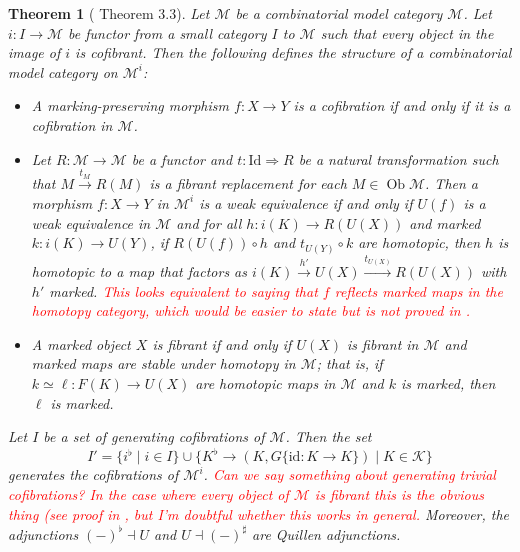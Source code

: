 \documentclass{article}
\newcommand{\todo}[1]{\textcolor{red}{#1}}
\newtheorem{theorem}{Theorem}
\begin{document}
\begin{theorem}[\cite{marked-objects} Theorem 3.3]
  \label{th:marked-model-category}
  Let $\mathcal{M}$ be a combinatorial model category $\mathcal{M}$.
  Let $i : I \rightarrow \mathcal{M}$ be functor from a small category $I$ to $\mathcal{M}$ such that every object in the image of $i$ is cofibrant.
  Then the following defines the structure of a combinatorial model category on $\mathcal{M}^i$:
  \begin{itemize}
    \item
      A marking-preserving morphism $f : X \rightarrow Y$ is a cofibration if and only if it is a cofibration in $\mathcal{M}$.
    \item
      Let $R : \mathcal{M} \rightarrow \mathcal{M}$ be a functor and $t : \mathrm{Id} \Rightarrow R$ be a natural transformation such that $M \xrightarrow{t_M} R(M)$ is a fibrant replacement for each $M \in \operatorname{Ob} \mathcal{M}$.
      Then a morphism $f : X \rightarrow Y$ in $\mathcal{M}^i$ is a weak equivalence if and only if $U(f)$ is a weak equivalence in $\mathcal{M}$ and for all $h : i(K) \rightarrow R(U(X))$ and marked $k : i(K) \rightarrow U(Y)$, if $R(U(f)) \circ h$ and $t_{U(Y)} \circ k$ are homotopic, then $h$ is homotopic to a map that factors as $i(K) \xrightarrow{h'} U(X) \xrightarrow{t_{U(X)}} R(U(X))$ with $h'$ marked.
      \todo{
        This looks equivalent to saying that $f$ reflects marked maps in the homotopy category, which would be easier to state but is not proved in \cite{marked-objects}.
      }
    \item
      A marked object $X$ is fibrant if and only if $U(X)$ is fibrant in $\mathcal{M}$ and marked maps are stable under homotopy in $\mathcal{M}$; that is, if $k \simeq \ell : F(K) \rightarrow U(X)$ are homotopic maps in $\mathcal{M}$ and $k$ is marked, then $\ell$ is marked.
  \end{itemize}
  Let $I$ be a set of generating cofibrations of $\mathcal{M}$.
  Then the set
  \begin{equation}
    I' = \{ i^\flat \mid i \in I \} \cup \{ K^\flat \rightarrow (K, G\{\mathrm{id} : K \rightarrow K\}) \mid K \in \mathcal{K} \}
  \end{equation}
  generates the cofibrations of $\mathcal{M}^i$.
  \todo{
    Can we say something about generating trivial cofibrations?
    In the case where every object of $\mathcal{M}$ is fibrant this is the obvious thing (see proof in \cite{marked-objects}, but I'm doubtful whether this works in general.
  }
  Moreover, the adjunctions $(-)^\flat \dashv U$ and $U \dashv (-)^\sharp$ are Quillen adjunctions.
\end{theorem}
\end{document}

